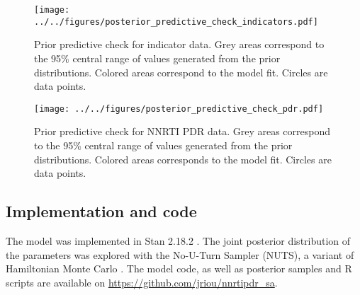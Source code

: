 \documentclass{article}
\begin{document}
	\begin{sidewaysfigure}[h]
		\texttt{[image: ../../figures/posterior\_predictive\_check\_indicators.pdf]}
		\caption{Prior predictive check for indicator data. Grey areas correspond to the 95\% central range of values generated from the prior distributions. Colored areas correspond to the model fit. Circles are data points.}
		\label{fig:ppc1}
	\end{sidewaysfigure}
	
	\begin{figure}[h]
		\centering
		\texttt{[image: ../../figures/posterior\_predictive\_check\_pdr.pdf]}
		\caption{Prior predictive check for NNRTI PDR data. Grey areas correspond to the 95\% central range of values generated from the prior distributions. Colored areas corresponds to the model fit. Circles are data points.}
		\label{fig:ppc2}
	\end{figure}
	
	
	\subsection{Implementation and code}
	
	The model was implemented in Stan 2.18.2 \cite{carpenter2017stan}.
	The joint posterior distribution of the parameters was explored with the No-U-Turn Sampler (NUTS), a variant of Hamiltonian Monte Carlo \cite{hoffman2014no}.
	The model code, as well as posterior samples and R scripts are available on \url{https://github.com/jriou/nnrtipdr_sa}.
	
\end{document}
